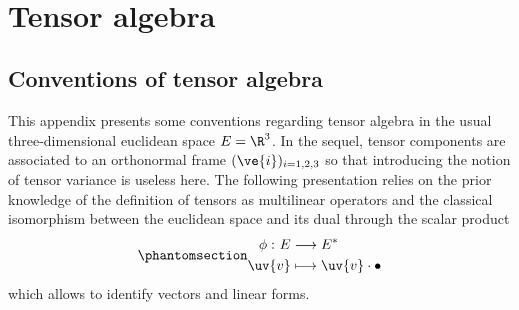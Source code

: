 \documentclass[
  letterpaper,
  DIV=11,
  numbers=noendperiod]{scrreprt}
\begin{document}
\(\,\)

\cleardoublepage
{}
{}
\appendix

\chapter{Tensor algebra}\label{sec-tensor_algebra}

\section{Conventions of tensor
algebra}\label{sec-tensoralgebra_convention}

This appendix presents some conventions regarding tensor algebra in the
usual three-dimensional euclidean space \(E=\R^3\). In the sequel,
tensor components are associated to an orthonormal frame
\((\ve{i})_{i=1,2,3}\) so that introducing the notion of tensor variance
is useless here. The following presentation relies on the prior
knowledge of the definition of tensors as multilinear operators and the
classical isomorphism between the euclidean space and its dual through
the scalar product
\begin{equation}\phantomsection\label{eq-scalarprod}{\begin{aligned}
\phi\,\colon E & \longrightarrow  E^* \\
       \uv{v} & \longmapsto \uv{v}\cdot\bullet
\end{aligned}}\end{equation} which allows to identify vectors and linear
forms.
\end{document}
